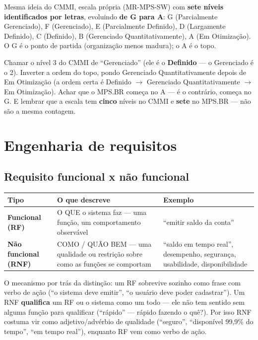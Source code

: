 \begin{conceito}
Mesma ideia do CMMI, escala própria (MR-MPS-SW) com \textbf{sete níveis
identificados por letras}, evoluindo \textbf{de G para A}: G (Parcialmente
Gerenciado), F (Gerenciado), E (Parcialmente Definido), D (Largamente
Definido), C (Definido), B (Gerenciado Quantitativamente), A (Em
Otimização). O G é o ponto de partida (organização menos madura); o A é o
topo.
\end{conceito}

\begin{cuidado}
Chamar o nível 3 do CMMI de “Gerenciado” (ele é o \textbf{Definido} --- o
Gerenciado é o 2). Inverter a ordem do topo, pondo Gerenciado
Quantitativamente depois de Em Otimização (a ordem certa é Definido $\to$
Gerenciado Quantitativamente $\to$ Em Otimização). Achar que o MPS.BR
começa no A --- é o contrário, começa no G. E lembrar que a escala tem
\textbf{cinco} níveis no CMMI e \textbf{sete} no MPS.BR --- não são a mesma
contagem.
\end{cuidado}

\section{Engenharia de requisitos}

\subsection{Requisito funcional x não funcional}

\begin{conceito}
\begin{center}
\begin{tabular}{@{}p{2.6cm}p{5.4cm}p{5cm}@{}}
\toprule
\textbf{Tipo} & \textbf{O que descreve} & \textbf{Exemplo} \\
\midrule
\textbf{Funcional (RF)} & O QUE o sistema faz --- uma função, um
comportamento observável & “emitir saldo da conta” \\
\textbf{Não funcional (RNF)} & COMO / QUÃO BEM --- uma qualidade ou
restrição sobre como as funções se comportam & “saldo em tempo real”,
desempenho, segurança, usabilidade, disponibilidade \\
\bottomrule
\end{tabular}
\end{center}

O mecanismo por trás da distinção: um RF sobrevive sozinho como frase com
verbo de ação (“o sistema deve emitir”, “o usuário deve poder cadastrar”).
Um RNF \textbf{qualifica} um RF ou o sistema como um todo --- ele não tem
sentido sem alguma função para qualificar (“rápido” --- rápido fazendo o
quê?). Por isso RNF costuma vir como adjetivo/advérbio de qualidade
(“seguro”, “disponível 99,9\% do tempo”, “em tempo real”), enquanto RF vem
como verbo de ação.
\end{conceito}

